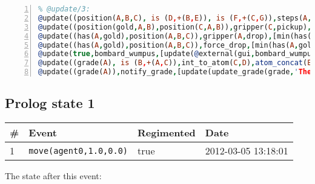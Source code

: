 \documentclass[11pt]{article}\usepackage[utf8]{inputenc}\usepackage{geometry}
\begin{document}
\begin{lstlisting}[language=Prolog, numbers=left]
% Rules with string id: @update
% @update/3:
@update((position(A,B,C), is (D,+(B,E)), is (F,+(C,G)),steps(A,H), is (I,+(H,1.0))),move(A,E,G),[min(position(A,B,C)),plus(position(A,D,F)),min(steps(A,H)),plus(steps(A,I))|[]])
@update((position(gold,A,B),position(C,A,B)),gripper(C,pickup),[plus(has(C,gold)),min(position(gold,A,B))|[]])
@update((has(A,gold),position(A,B,C)),gripper(A,drop),[min(has(A,gold)),plus(position(gold,B,C))|[]])
@update((has(A,gold),position(A,B,C)),force_drop,[min(has(A,gold)),plus(position(gold,B,C)),update(@external(gui,gripper,D))|[]])
@update(true,bombard_wumpus,[update(@external(gui,bombard_wumpus,A)),min(alive(wumpus))|[]])
@update((grade(A), is (B,+(A,C)),int_to_atom(C,D),atom_concat(E,D,F)),update_grade(G,E,C),[min(grade(A)),plus(grade(B)),update(@external(gui,show_notice(G,F),H))|[]])
@update((grade(A)),notify_grade,[update(update_grade(grade,'The end result: ',A))|[]])

\end{lstlisting}
\clearpage 
\subsection{Prolog state 1}
\begin{table}[ht]
\centering 
\begin{tabular}{l l l l} 
\textbf{\#} & \textbf{Event} & \textbf{Regimented} & \textbf{Date} \\ [0.5ex] 
\hline
1&\texttt{move(agent0,1.0,0.0)}&true&2012-03-05 13:18:01\\ [1ex] \hline\end{tabular}
\end{table}
The state after this event:
\end{document}
